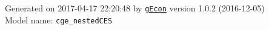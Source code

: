 \documentclass[10pt,a4paper]{article}
\numberwithin{equation}{section}
\begin{document}
\begin{landscape}
\begin{flushleft}{\large
Generated  on 2017-04-17 22:20:48 by \href{http://gecon.r-forge.r-project.org/}{\texttt{gEcon}} version 1.0.2 (2016-12-05)\\
Model name: \verb+cge_nestedCES+
}\end{flushleft}


\end{landscape}

\end{document}

